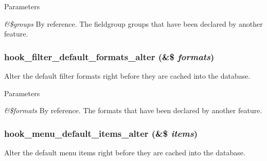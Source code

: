 \begin{DoxyParams}{Parameters}
\item[{\em \&\$groups}]By reference. The fieldgroup groups that have been declared by another feature. \end{DoxyParams}
\hypertarget{group__features__component__alter__hooks_gae14b73f67a50cd515cac9718d84014f4}{
\subsubsection[{hook\_\-filter\_\-default\_\-formats\_\-alter}]{\setlength{\rightskip}{0pt plus 5cm}hook\_\-filter\_\-default\_\-formats\_\-alter (\&\$ {\em formats})}}
\label{group__features__component__alter__hooks_gae14b73f67a50cd515cac9718d84014f4}
Alter the default filter formats right before they are cached into the database.


\begin{DoxyParams}{Parameters}
\item[{\em \&\$formats}]By reference. The formats that have been declared by another feature. \end{DoxyParams}
\hypertarget{group__features__component__alter__hooks_ga3b0718b5296604a189304b76378b0467}{
\subsubsection[{hook\_\-menu\_\-default\_\-items\_\-alter}]{\setlength{\rightskip}{0pt plus 5cm}hook\_\-menu\_\-default\_\-items\_\-alter (\&\$ {\em items})}}
\label{group__features__component__alter__hooks_ga3b0718b5296604a189304b76378b0467}
Alter the default menu items right before they are cached into the database.


